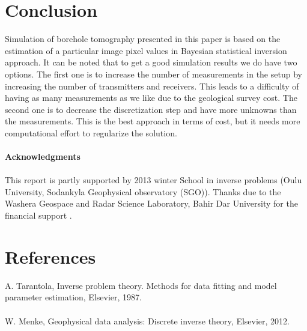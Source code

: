 \documentclass[12pt,A4]{article}
\begin{document}
\section{Conclusion}
Simulation of borehole tomography presented in this paper is based on the estimation of a particular image pixel values in Bayesian statistical inversion approach. It can be noted that to get a good simulation results we do have two options. The first one is to increase the number of measurements in the setup by increasing the number of transmitters and receivers. This leads to a difficulty of having as many measurements as we like due to the geological survey cost. The second one is to decrease the discretization step and have more unknowns than the measurements. This is the best approach in terms of cost, but it needs more computational effort to regularize the solution.\\\\
\textbf{Acknowledgments}\\\\
This report is partly supported by 2013 winter School in inverse problems (Oulu University, Sodankyla Geophysical observatory (SGO)). Thanks due to the  Washera Geospace and Radar Science Laboratory, Bahir Dar University for the financial support .
\section{References}
A. Tarantola, Inverse problem theory. Methods for data fitting and model parameter estimation, Elsevier, 1987. \\\\
W. Menke, Geophysical data analysis: Discrete inverse theory, Elsevier, 2012. 
\end{document}
